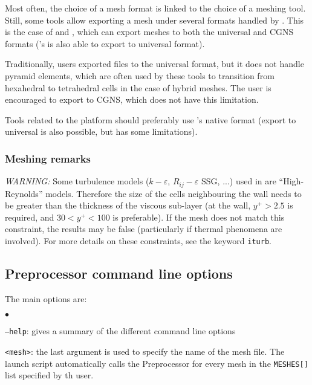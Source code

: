 {{{Most often, the choice of a mesh format is linked to the choice of
a meshing tool. Still, some tools allow exporting a mesh under several
formats handled by \CS. This is the case of \fluent and \icemcfd,
which can export meshes to both the \ideas universal and CGNS formats
(\fluent's \gambit is also able to export to \ideas universal format).

Traditionally, users exported files to the \ideas universal format,
but it does not handle pyramid elements, which are often used by these
tools to transition from hexahedral to tetrahedral cells in the case
of hybrid meshes. The user is encouraged to export to CGNS, which
does not have this limitation.

Tools related to the \salome platform should preferably use
\salome{}'s native \med format (export to \ideas universal is
also possible, but has some limitations).

\subsubsection{Meshing remarks}
\label{sec:prg_meshes}%

{\em WARNING: }
Some turbulence models ($k-\varepsilon$, $R_{ij}-\varepsilon$ SSG, ...) used in
\CS are ``High-Reynolds'' models. Therefore the size of the cells
neighbouring the wall needs to be greater than the thickness of the viscous
sub-layer (at the wall, $y^+>2.5$ is required, and $30<y^+<100$ is
preferable). If the mesh does not match this constraint, the results may
be false (particularly if thermal phenomena are involved). For more details
on these constraints, see the keyword \texttt{iturb}.

\subsection{Preprocessor command line options}
\label{sec:prg_optappelecs}%
The main options are:
\begin{list}{$\bullet$}{}
\item \texttt{--help}: gives a summary of the different command line options

\item \texttt{<mesh>}: the last argument is used to specify the name of the mesh file.
The launch script automatically calls the Preprocessor for every
mesh in the \texttt{MESHES[]} list specified by th user.


\end{list}}}}
